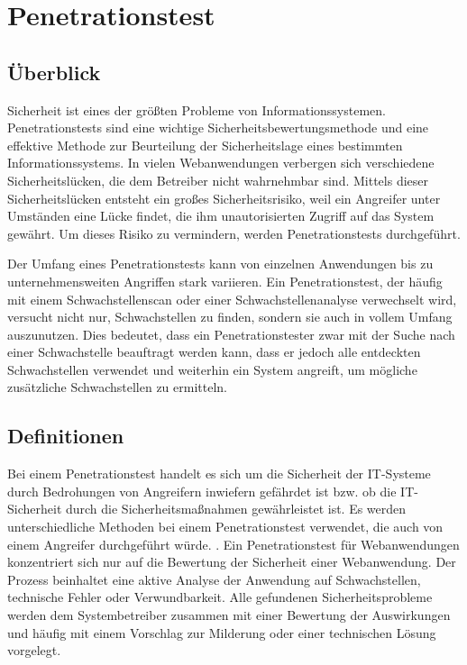 \chapter{Penetrationstest}
\label{chap:k4}

\section{Überblick}

Sicherheit ist eines der größten Probleme von Informationssystemen. Penetrationstests sind eine wichtige Sicherheitsbewertungsmethode und eine effektive Methode zur Beurteilung der Sicherheitslage eines bestimmten Informationssystems. In vielen Webanwendungen verbergen sich verschiedene Sicherheitslücken, die dem Betreiber nicht wahrnehmbar sind. Mittels dieser Sicherheitslücken entsteht ein großes Sicherheitsrisiko, weil ein Angreifer unter Umständen eine Lücke findet, die ihm unautorisierten Zugriff auf das System gewährt. Um dieses Risiko zu vermindern, werden Penetrationstests durchgeführt.

Der Umfang eines Penetrationstests kann von einzelnen Anwendungen bis zu unternehmensweiten Angriffen stark variieren. Ein Penetrationstest, der häufig mit einem Schwachstellenscan oder einer Schwachstellenanalyse verwechselt wird, versucht nicht nur, Schwachstellen zu finden, sondern sie auch in vollem Umfang auszunutzen. Dies bedeutet, dass ein Penetrationstester zwar mit der Suche nach einer Schwachstelle beauftragt werden kann, dass er jedoch alle entdeckten Schwachstellen verwendet und weiterhin ein System angreift, um mögliche zusätzliche Schwachstellen zu ermitteln\cite{northcutt2006}.


\section{Definitionen}

Bei einem Penetrationstest handelt es sich um die Sicherheit der IT-Systeme durch Bedrohungen von Angreifern inwiefern gefährdet ist bzw. ob die IT-Sicherheit durch die Sicherheitsmaßnahmen gewährleistet ist. Es werden unterschiedliche Methoden bei einem Penetrationstest verwendet, die auch von einem Angreifer durchgeführt würde. \cite[5--6]{pt03bsi}. Ein Penetrationstest für Webanwendungen konzentriert sich nur auf die Bewertung der Sicherheit einer Webanwendung. Der Prozess beinhaltet eine aktive Analyse der Anwendung auf Schwachstellen, technische Fehler oder Verwundbarkeit. Alle gefundenen Sicherheitsprobleme werden dem Systembetreiber zusammen mit einer Bewertung der Auswirkungen und häufig mit einem Vorschlag zur Milderung oder einer technischen Lösung vorgelegt\cite[46]{meucci2008owasp}.

